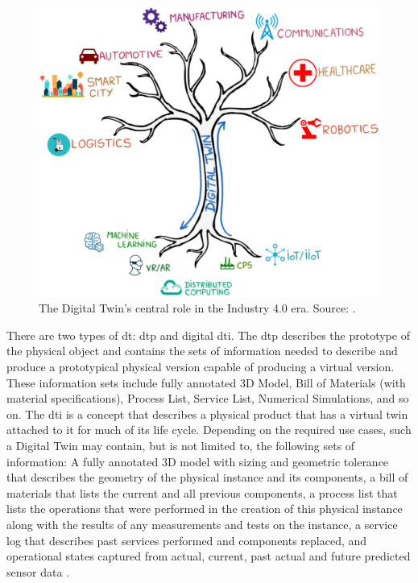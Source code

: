 \begin{figure}[ht!]
    \centering
    \includegraphics[scale=0.75]{images/Related/DTTree.png}
    \caption{The Digital Twin’s central role in the Industry 4.0 era. Source: \cite{Mihai2022}.}

    \label{fig:digitalTwinTree}
\end{figure}


There are two types of \acrlong{dt}: \acrlong{dtp} and digital \acrlong{dti}. The \acrshort{dtp} describes the prototype of the physical object and contains the sets of information needed to describe and produce a prototypical physical version capable of producing a virtual version.  These information sets include fully annotated 3D Model, Bill of Materials (with material specifications), Process List, Service List, Numerical Simulations, and so on.  The \acrlong{dti} is a concept that describes a physical product that has a virtual twin attached to it for much of its life cycle. Depending on the required use cases, such a Digital Twin may contain, but is not limited to, the following sets of information: A fully annotated 3D model with sizing and geometric tolerance that describes the geometry of the physical instance and its components, a bill of materials that lists the current and all previous components, a process list that lists the operations that were performed in the creation of this physical instance along with the results of any measurements and tests on the instance, a service log that describes past services performed and components replaced, and operational states captured from actual, current, past actual and future predicted sensor data \cite{Grieves2017}. 
  

